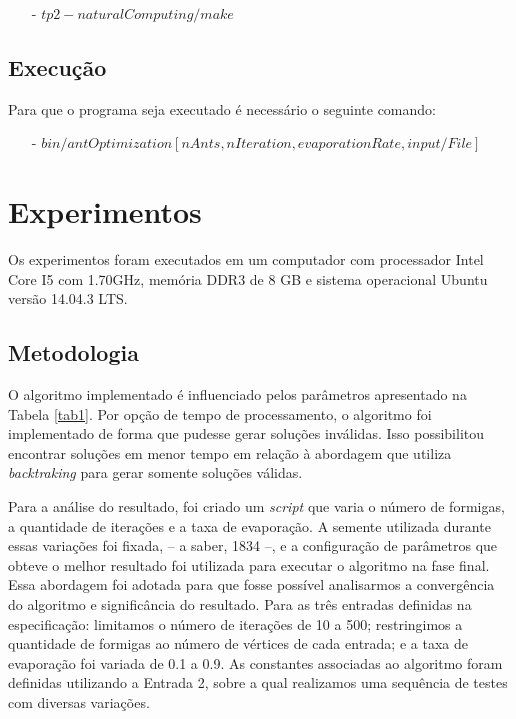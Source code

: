 \documentclass[a4paper, 12pt]{article}
\begin{document}
\begin{enumerate}
\item[-] $tp2-naturalComputing/make$
\end{enumerate}


\subsection{Execução}
Para que o programa seja executado é necessário o seguinte comando:

\begin{enumerate}
\item[-] $bin/antOptimization [nAnts, nIteration, evaporationRate, input/File]$
\end{enumerate}

\section{Experimentos}
Os experimentos foram executados em um computador com processador Intel Core I5 com 1.70GHz, memória DDR3 de 8 GB e sistema operacional Ubuntu versão 14.04.3 LTS.


\subsection{Metodologia}
O algoritmo implementado é influenciado pelos parâmetros apresentado na Tabela \ref{tab1}. Por opção de tempo de processamento, o algoritmo foi implementado de forma que pudesse gerar soluções inválidas. Isso possibilitou encontrar soluções em menor tempo em relação à abordagem que utiliza \textit{backtraking} para gerar somente soluções válidas. 

Para a análise do resultado, foi criado um \textit{script} que varia o número de formigas, a quantidade de iterações e a taxa de evaporação. A semente utilizada durante essas variações foi fixada, -- a saber, 1834 --, e a configuração de parâmetros que obteve o melhor resultado foi utilizada para executar o algoritmo na fase final.
Essa abordagem foi adotada para que fosse possível analisarmos a convergência do algoritmo e significância do resultado. Para as três entradas definidas na especificação: limitamos o número de iterações de 10 a 500; restringimos a quantidade de formigas ao número de vértices de cada entrada; e a taxa de evaporação foi variada de 0.1 a 0.9. As constantes associadas ao algoritmo foram definidas utilizando a Entrada 2, sobre a qual realizamos uma sequência de testes com diversas variações.
\end{document}
